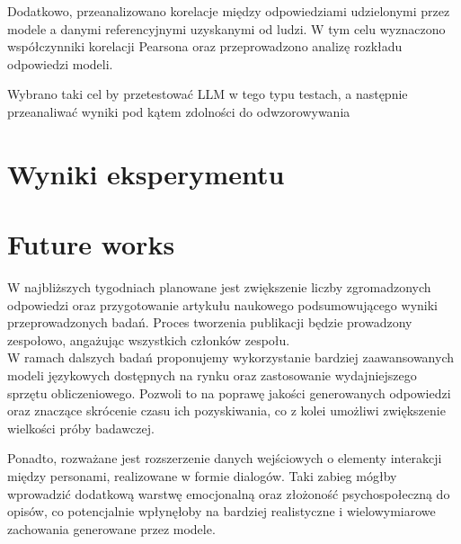 \documentclass{article}
\begin{document}
Dodatkowo, przeanalizowano korelacje między odpowiedziami udzielonymi przez modele a danymi referencyjnymi uzyskanymi od ludzi. W tym celu wyznaczono współczynniki korelacji Pearsona oraz przeprowadzono analizę rozkładu odpowiedzi modeli.

Wybrano taki cel by przetestować LLM w tego typu testach, a następnie przeanaliwać wyniki pod kątem zdolności do odwzorowywania

\section{Wyniki eksperymentu}

\section{Future works}
W najbliższych tygodniach planowane jest zwiększenie liczby zgromadzonych odpowiedzi oraz przygotowanie artykułu naukowego podsumowującego wyniki przeprowadzonych badań. Proces tworzenia publikacji będzie prowadzony zespołowo, angażując wszystkich członków zespołu. \\

W ramach dalszych badań proponujemy wykorzystanie bardziej zaawansowanych modeli językowych dostępnych na rynku oraz zastosowanie wydajniejszego sprzętu obliczeniowego. Pozwoli to na poprawę jakości generowanych odpowiedzi oraz znaczące skrócenie czasu ich pozyskiwania, co z kolei umożliwi zwiększenie wielkości próby badawczej.

Ponadto, rozważane jest rozszerzenie danych wejściowych o elementy interakcji między personami, realizowane w formie dialogów. Taki zabieg mógłby wprowadzić dodatkową warstwę emocjonalną oraz złożoność psychospołeczną do opisów, co potencjalnie wpłynęłoby na bardziej realistyczne i wielowymiarowe zachowania generowane przez modele.
\end{document}
